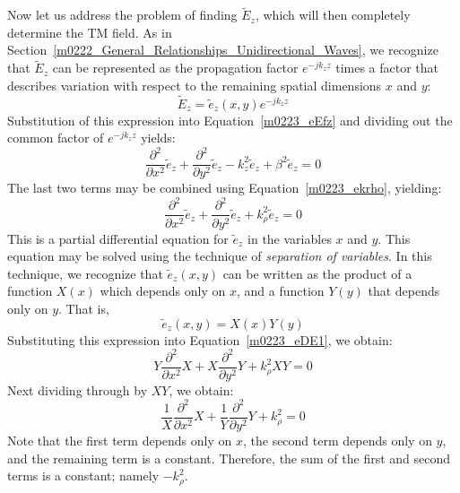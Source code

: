 Now let us address the problem of finding $\widetilde{E}_z$, which will then completely determine the TM field.  As in Section~\ref{m0222_General_Relationships_Unidirectional_Waves}, we recognize that $\widetilde{E}_z$ can be represented as the propagation factor $e^{-jk_z z}$ times a factor that describes variation with respect to the remaining spatial dimensions $x$ and $y$:
%
\begin{equation}
\widetilde{E}_z = \widetilde{e}_z(x,y) e^{-jk_z z} 
\end{equation}
%
Substitution of this expression into Equation~\ref{m0223_eEfz} and dividing out the common factor of $e^{-jk_z z}$ yields:
%
\begin{equation}
\frac{\partial^2}{\partial x^2}\widetilde{e}_z + \frac{\partial^2}{\partial y^2}\widetilde{e}_z - k_z^2 \widetilde{e}_z + \beta^2 \widetilde{e}_z = 0
\end{equation}
%
The last two terms may be combined using Equation~\ref{m0223_ekrho}, yielding:
%
\begin{equation}
\frac{\partial^2}{\partial x^2}\widetilde{e}_z + \frac{\partial^2}{\partial y^2}\widetilde{e}_z + k_{\rho}^2 \widetilde{e}_z = 0 \label{m0223_eDE1}
\end{equation}
%
This is a partial differential equation for $\widetilde{e}_z$ in the variables $x$ and $y$.
This equation may be solved using the technique of \emph{separation of variables}.
In this technique, we recognize that $\widetilde{e}_z(x,y)$ can be written as the product of a function $X(x)$ which depends only on $x$, and a function $Y(y)$ that depends only on $y$.
That is,
%
\begin{equation}
\widetilde{e}_z(x,y) = X(x) Y(y)
\end{equation}
%
Substituting this expression into Equation~\ref{m0223_eDE1}, we obtain:
%
\begin{equation}
Y\frac{\partial^2}{\partial x^2}X + X\frac{\partial^2}{\partial y^2}Y + k_{\rho}^2 XY = 0 \label{m0223_eDE2}
\end{equation}
%
Next dividing through by $XY$, we obtain:
%
\begin{equation}
\frac{1}{X}\frac{\partial^2}{\partial x^2}X + \frac{1}{Y}\frac{\partial^2}{\partial y^2}Y + k_{\rho}^2 = 0 \label{m0223_eDE3}
\end{equation}
%
Note that the first term depends only on $x$, the second term depends only on $y$, and the remaining term is a constant.
Therefore, the sum of the first and second terms is a constant; namely $-k_{\rho}^2$.

